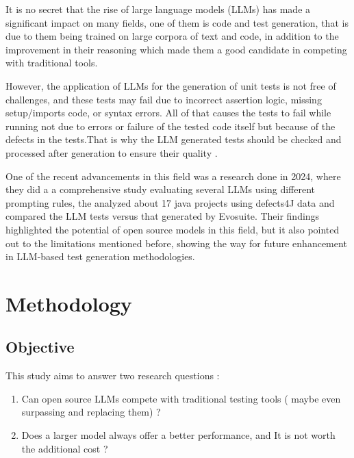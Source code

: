 \documentclass[12pt]{article}
\begin{document}
It is no secret that the rise of large language models (LLMs) has made a significant impact on many fields, one of them is code and test generation, that is due to them being trained on large corpora of text and code, in addition to the improvement in their reasoning which made them a good candidate in competing with traditional tools.

\vspace{1em}

However, the application of LLMs for the generation of unit tests is not free of challenges, and these tests may fail due to incorrect assertion logic, missing setup/imports code, or syntax errors. All of that causes the tests to fail while running not due to errors or failure of the tested code itself but because of the defects in the tests.That is why the LLM generated tests should be checked and processed after generation to ensure their quality \cite{jiang2024survey}.

\vspace{1em}

One of the recent advancements in this field was a research\cite{yang2024evaluation} done in 2024, where they did a a comprehensive study evaluating several LLMs using different prompting rules, the analyzed about 17 java projects using defects4J data and compared the LLM tests versus that generated by Evosuite. Their findings highlighted the potential of open source models in this field, but it also pointed out to the limitations mentioned before, showing the way for future enhancement in LLM-based test generation methodologies.


\section {Methodology}

\subsection {Objective}

This study aims to answer two research questions :

\begin{enumerate}
    \item Can open source LLMs compete with traditional testing tools ( maybe even surpassing and replacing them) ?
    \item Does a larger model always offer a better performance, and It is not worth the additional cost ? 
\end{enumerate}
\end{document}
